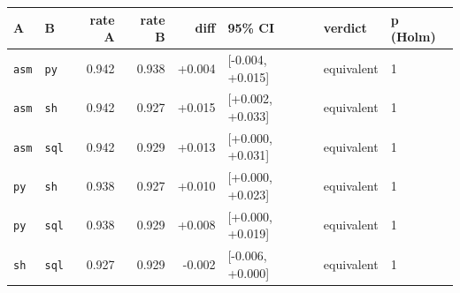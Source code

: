 \begin{tabular}{llrrrlll}
\toprule
A & B & rate A & rate B & diff & 95\% CI & verdict & p (Holm) \\
\midrule
\texttt{asm} & \texttt{py} & 0.942 & 0.938 & +0.004 & [-0.004, +0.015] & equivalent & 1 \\
\texttt{asm} & \texttt{sh} & 0.942 & 0.927 & +0.015 & [+0.002, +0.033] & equivalent & 1 \\
\texttt{asm} & \texttt{sql} & 0.942 & 0.929 & +0.013 & [+0.000, +0.031] & equivalent & 1 \\
\texttt{py} & \texttt{sh} & 0.938 & 0.927 & +0.010 & [+0.000, +0.023] & equivalent & 1 \\
\texttt{py} & \texttt{sql} & 0.938 & 0.929 & +0.008 & [+0.000, +0.019] & equivalent & 1 \\
\texttt{sh} & \texttt{sql} & 0.927 & 0.929 & -0.002 & [-0.006, +0.000] & equivalent & 1 \\
\bottomrule
\end{tabular}
